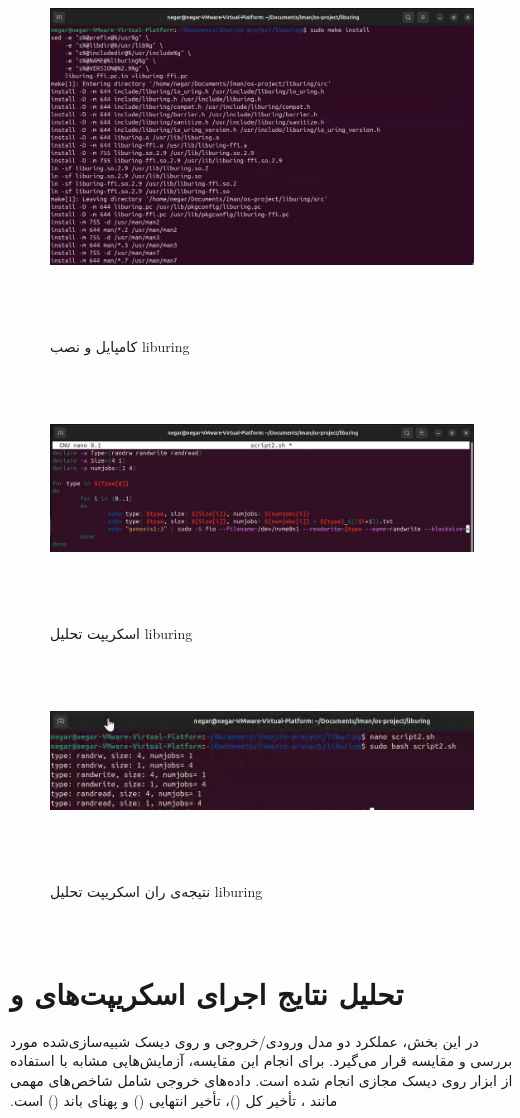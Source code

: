 ‫
‫
‫‫‫\begin{figure}[H]
‫	‫	‫	‫	‫	‫    \centering
‫	‫	‫	‫	‫	‫    \includegraphics[width=\textwidth]{figs/26.jpg}
‫	‫	‫			\caption{کامپایل و نصب liburing}
‫‫\end{figure}
‫
‫
‫‫‫\begin{figure}[H]
‫	‫	‫	‫	‫    \centering
‫	‫	‫	‫	‫    \includegraphics[width=\textwidth]{figs/27.jpg}
‫	‫			\caption{اسکریپت تحلیل liburing}
‫	‫\end{figure}
‫
‫‫‫\begin{figure}[H]
‫	‫	‫	‫	‫    \centering
‫	‫	‫	‫	‫    \includegraphics[width=\textwidth]{figs/28.jpg}
‫	‫			\caption{نتیجه‌ی ران اسکریپت تحلیل liburing}
‫	‫\end{figure}
‫
‫\section*{تحلیل نتایج اجرای اسکریپت‌های  و }
‫
‫در این بخش، عملکرد دو مدل ورودی/خروجی  و  روی دیسک شبیه‌سازی‌شده  مورد بررسی و مقایسه قرار می‌گیرد. برای انجام این مقایسه، آزمایش‌هایی مشابه با استفاده از ابزار  روی دیسک مجازی انجام شده است. داده‌های خروجی شامل شاخص‌های مهمی مانند ، تأخیر کل ()، تأخیر انتهایی () و پهنای باند () است.
